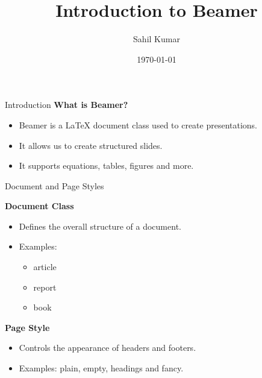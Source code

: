 \documentclass{beamer}
\title{Introduction to Beamer}
\author{Sahil Kumar}
\institute{MNIT Jaipur}
\date{\today}
\begin{document}
\begin{frame}
    \titlepage
\end{frame}

\begin{frame}{Introduction}
    \textbf{What is Beamer?}

    \begin{itemize}
        \item Beamer is a LaTeX document class used to create presentations.
        \item It allows us to create structured slides.
        \item It supports equations, tables, figures and more.
    \end{itemize}
\end{frame}
\begin{frame}{Document and Page Styles}

    \textbf{Document Class}

    \begin{itemize}
        \item Defines the overall structure of a document.
        \item Examples:
        \begin{itemize}
            \item article
            \item report
            \item book
        \end{itemize}
    \end{itemize}

    \vspace{0.3cm}

    \textbf{Page Style}

    \begin{itemize}
        \item Controls the appearance of headers and footers.
        \item Examples: plain, empty, headings and fancy.
    \end{itemize}

\end{frame}
\end{document}
